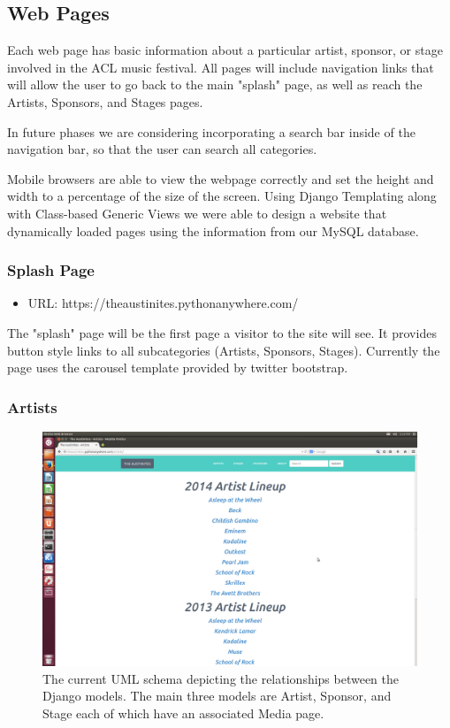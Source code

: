 \documentclass[12pt,english]{scrartcl}
\begin{document}
\subsection{Web Pages}
Each web page has basic information about a particular artist, sponsor, or stage involved in the ACL music festival.
All pages will include  navigation links that will allow the user to go back to the main "splash" page, as well as reach the Artists, Sponsors, and
Stages pages. 

In future phases we are considering incorporating a search bar inside of the navigation bar, so that the user can search
all categories.

Mobile browsers are able to view the webpage correctly and set the height and width to a percentage of the size of the screen.
Using Django Templating along with Class-based Generic Views we were able to design a website that dynamically loaded pages using the information from our MySQL database.


\subsubsection{Splash Page}
\begin{itemize}
 \item URL: https://theaustinites.pythonanywhere.com/
\end{itemize}

The "splash" page will be the first page a visitor to the site will see. It provides button style links to all subcategories (Artists,
Sponsors, Stages). Currently the page uses the carousel template provided by twitter bootstrap.

\subsubsection{Artists}
\begin{figure}[h!]
\includegraphics[width=\textwidth]{artists.png}
 \caption{The current UML schema depicting the relationships between the Django models. The main three models are Artist, Sponsor, and Stage each of which have an associated Media page.}
\end{figure}
\end{document}
